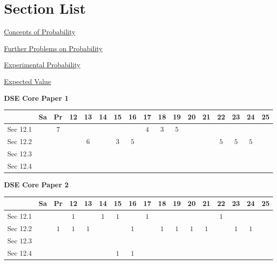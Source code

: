 \documentclass[12pt, a4paper]{article}
\begin{document}
\section*{Section List}
\begin{enumx}[label=Sec 12.\arabic*\ ]
\item \hyperref[section:3-12-1]{Concepts of Probability }
\item \hyperref[section:3-12-2]{Further Problems on Probability}
\item \hyperref[section:3-12-3]{Experimental Probability}
\item \hyperref[section:3-12-4]{Expected Value}
\end{enumx}
\begin{absolutelynopagebreak}
\begin{center}
\textbf{DSE Core Paper 1}
\end{center}
\begin{center}
\begin{tabular}{|l|c|c|c|c|c|c|c|c|c|c|c|c|c|c|c|c|}
\hline
        & Sa & Pr & 12 & 13 & 14 & 15 & 16 & 17 & 18 & 19 & 20 & 21 & 22 & 23 & 24 & 25 \\\hline\hline
Sec 12.1 &  &  $7$ &  &  &  &  &  &  $4$ &  $3$ &  $5$ &  &  &  &  &  &  \\\hline
Sec 12.2 &  &  &  &  $6$ &  &  $3$ &  $5$ &  &  &  &  &  &  $5$ &  $5$ &  $5$ &  \\\hline
Sec 12.3 &  &  &  &  &  &  &  &  &  &  &  &  &  &  &  &  \\\hline
Sec 12.4 &  &  &  &  &  &  &  &  &  &  &  &  &  &  &  &  \\\hline
\end{tabular}
\end{center}
\end{absolutelynopagebreak}
\begin{absolutelynopagebreak}
\begin{center}
\textbf{DSE Core Paper 2}
\end{center}
\begin{center}
\begin{tabular}{|l|c|c|c|c|c|c|c|c|c|c|c|c|c|c|c|c|}
\hline
        & Sa & Pr & 12 & 13 & 14 & 15 & 16 & 17 & 18 & 19 & 20 & 21 & 22 & 23 & 24 & 25 \\\hline\hline
Sec 12.1 &  &  &  $1$ &  &  $1$ &  $1$ &  &  $1$ &  &  &  &  &  $1$ &  &  &  \\\hline
Sec 12.2 &  &  $1$ &  $1$ &  $1$ &  &  &  $1$ &  &  $1$ &  $1$ &  $1$ &  $1$ &  &  $1$ &  $1$ &  \\\hline
Sec 12.3 &  &  &  &  &  &  &  &  &  &  &  &  &  &  &  &  \\\hline
Sec 12.4 &  &  &  &  &  &  $1$ &  $1$ &  &  &  &  &  &  &  &  &  \\\hline
\end{tabular}
\end{center}
\end{absolutelynopagebreak}
\end{document}

